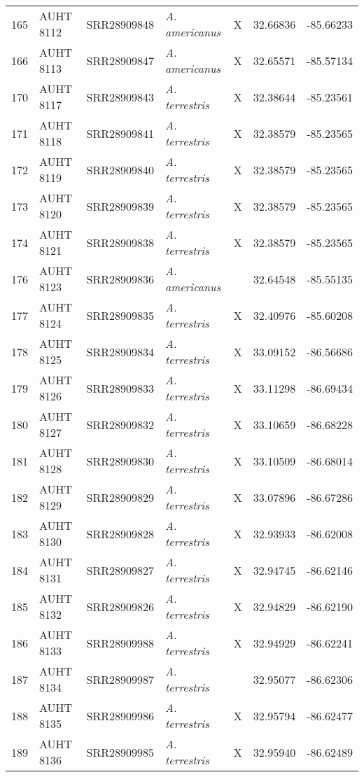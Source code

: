 \begin{longtable}{ lllllll }
165 & AUHT 8112 & SRR28909848 & \textit{A. americanus} & X & 32.66836 & -85.66233 \\ 
166 & AUHT 8113 & SRR28909847 & \textit{A. americanus} & X & 32.65571 & -85.57134 \\ 
170 & AUHT 8117 & SRR28909843 & \textit{A. terrestris} & X & 32.38644 & -85.23561 \\ 
171 & AUHT 8118 & SRR28909841 & \textit{A. terrestris} & X & 32.38579 & -85.23565 \\ 
172 & AUHT 8119 & SRR28909840 & \textit{A. terrestris} & X & 32.38579 & -85.23565 \\ 
173 & AUHT 8120 & SRR28909839 & \textit{A. terrestris} & X & 32.38579 & -85.23565 \\ 
174 & AUHT 8121 & SRR28909838 & \textit{A. terrestris} & X & 32.38579 & -85.23565 \\ 
176 & AUHT 8123 & SRR28909836 & \textit{A. americanus} &  & 32.64548 & -85.55135 \\ 
177 & AUHT 8124 & SRR28909835 & \textit{A. terrestris} & X & 32.40976 & -85.60208 \\ 
178 & AUHT 8125 & SRR28909834 & \textit{A. terrestris} & X & 33.09152 & -86.56686 \\ 
179 & AUHT 8126 & SRR28909833 & \textit{A. terrestris} & X & 33.11298 & -86.69434 \\ 
180 & AUHT 8127 & SRR28909832 & \textit{A. terrestris} & X & 33.10659 & -86.68228 \\ 
181 & AUHT 8128 & SRR28909830 & \textit{A. terrestris} & X & 33.10509 & -86.68014 \\ 
182 & AUHT 8129 & SRR28909829 & \textit{A. terrestris} & X & 33.07896 & -86.67286 \\ 
183 & AUHT 8130 & SRR28909828 & \textit{A. terrestris} & X & 32.93933 & -86.62008 \\ 
184 & AUHT 8131 & SRR28909827 & \textit{A. terrestris} & X & 32.94745 & -86.62146 \\ 
185 & AUHT 8132 & SRR28909826 & \textit{A. terrestris} & X & 32.94829 & -86.62190 \\ 
186 & AUHT 8133 & SRR28909988 & \textit{A. terrestris} & X & 32.94929 & -86.62241 \\ 
187 & AUHT 8134 & SRR28909987 & \textit{A. terrestris} &  & 32.95077 & -86.62306 \\ 
188 & AUHT 8135 & SRR28909986 & \textit{A. terrestris} & X & 32.95794 & -86.62477 \\ 
189 & AUHT 8136 & SRR28909985 & \textit{A. terrestris} & X & 32.95940 & -86.62489 \\ 

\end{longtable}
